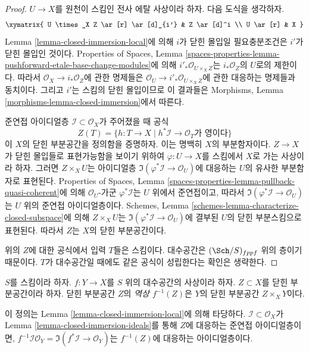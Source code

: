 \begin{proof}
$U \to X$를 원천이 스킴인 전사 에탈 사상이라 하자.
다음 도식을 생각하자.
$$
\xymatrix{
U \times_X Z \ar[r] \ar[d]_{i'} & Z \ar[d]^i \\
U \ar[r] & X
}
$$
Lemma \ref{lemma-closed-immersion-local}에 의해
$i$가 닫힌 몰입일 필요충분조건은 $i'$가 닫힌 몰입인 것이다.
Properties of Spaces, Lemma
\ref{spaces-properties-lemma-pushforward-etale-base-change-modules}에 의해
$i'_*\mathcal{O}_{U \times_X Z}$는 $i_*\mathcal{O}_Z$의 $U$로의
제한이다. 따라서 $\mathcal{O}_X \to i_*\mathcal{O}_Z$에 관한
명제들은 $\mathcal{O}_U \to i'_*\mathcal{O}_{U \times_X Z}$에 관한
대응하는 명제들과 동치이다. 그리고 $i'$는 스킴의 닫힌 몰입이므로
이 결과들은 Morphisms, Lemma
\ref{morphisms-lemma-closed-immersion}에서 따른다.

\medskip\noindent
준연접 아이디얼층 $\mathcal{I} \subset \mathcal{O}_X$가 주어졌을 때
공식
$$
Z(T) = \{h : T \to X \mid h^*\mathcal{I} \to \mathcal{O}_T
\text{가 영이다}\}
$$
이 $X$의 닫힌 부분공간을 정의함을 증명하자.
이는 명백히 $X$의 부분함자이다.
$Z \to X$가 닫힌 몰입들로 표현가능함을 보이기 위하여
$\varphi : U \to X$를 스킴에서 $X$로 가는 사상이라 하자.
그러면 $Z \times_X U$는 아이디얼층
$\Im(\varphi^*\mathcal{I} \to \mathcal{O}_U)$에 대응하는
$U$의 유사한 부분함자로 표현된다. Properties of Spaces, Lemma
\ref{spaces-properties-lemma-pullback-quasi-coherent}에 의해
$\mathcal{O}_U$-가군 $\varphi^*\mathcal{I}$는 $U$ 위에서
준연접이고, 따라서 $\Im(\varphi^*\mathcal{I} \to \mathcal{O}_U)$는
$U$ 위의 준연접 아이디얼층이다. Schemes, Lemma
\ref{schemes-lemma-characterize-closed-subspace}에 의해
$Z \times_X U$는
$\Im(\varphi^*\mathcal{I} \to \mathcal{O}_U)$에 결부된
$U$의 닫힌 부분스킴으로 표현된다. 따라서 $Z$는 $X$의 닫힌
부분공간이다.

\medskip\noindent
위의 $Z$에 대한 공식에서 입력 $T$들은 스킴이다. 대수공간은
$(\Sch/S)_{fppf}$ 위의 층이기 때문이다. $T$가 대수공간일 때에도
같은 공식이 성립한다는 확인은 생략한다.
\end{proof}

\begin{definition}
\label{definition-inverse-image-closed-subspace}
$S$를 스킴이라 하자. $f : Y \to X$를 $S$ 위의 대수공간의
사상이라 하자. $Z \subset X$를 닫힌 부분공간이라 하자.
닫힌 부분공간 $Z$의 {\it 역상 $f^{-1}(Z)$}은
$Y$의 닫힌 부분공간 $Z \times_X Y$이다.
\end{definition}

\noindent
이 정의는 Lemma \ref{lemma-closed-immersion-local}에 의해 타당하다.
$\mathcal{I} \subset \mathcal{O}_X$가 Lemma
\ref{lemma-closed-immersion-ideals}를 통해 $Z$에 대응하는 준연접
아이디얼층이면,
$f^{-1}\mathcal{I}\mathcal{O}_Y = \Im(f^*\mathcal{I} \to \mathcal{O}_Y)$는
$f^{-1}(Z)$에 대응하는 아이디얼층이다.

